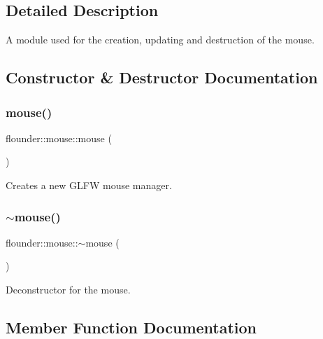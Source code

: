 \subsection{Detailed Description}
A module used for the creation, updating and destruction of the mouse. 



\subsection{Constructor \& Destructor Documentation}
\mbox{\label{classflounder_1_1mouse_a60e59355a55844e8ca559e2f6b9c82e9}} 
\subsubsection{\texorpdfstring{mouse()}{mouse()}}
{\footnotesize\ttfamily flounder\+::mouse\+::mouse (\begin{DoxyParamCaption}{ }\end{DoxyParamCaption})}



Creates a new G\+L\+FW mouse manager. 

\mbox{\label{classflounder_1_1mouse_a3038f39f358e37d15059af6c1675497b}} 
\subsubsection{\texorpdfstring{$\sim$mouse()}{~mouse()}}
{\footnotesize\ttfamily flounder\+::mouse\+::$\sim$mouse (\begin{DoxyParamCaption}{ }\end{DoxyParamCaption})}



Deconstructor for the mouse. 



\subsection{Member Function Documentation}
\mbox{\label{classflounder_1_1mouse_afa21b270438542e8d77133156a1a43c9}} 
